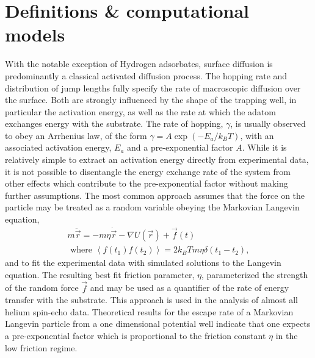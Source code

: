 \documentclass[7pt]{article}
\begin{document}
\section*{Definitions \& computational models}

With the notable exception of Hydrogen adsorbates\cite{McIntosh2013}, surface diffusion is predominantly a classical activated diffusion process. The hopping rate and distribution of jump lengths fully specify the rate of macroscopic diffusion over the surface. Both are strongly influenced by the shape of the trapping well, in particular the activation energy, as well as the rate at which the adatom exchanges energy with the substrate. The rate of hopping, $\gamma$, is usually observed to obey an Arrhenius law, of the form $\gamma = A\exp\left(-E_a/k_BT\right)$, with an associated activation energy, $E_a$ and a pre-exponential factor $A$. While it is relatively simple to extract an activation energy directly from experimental data\cite{Diamant,Alexandrowicz2006}, it is not possible to disentangle the energy exchange rate of the system from other effects which contribute to the pre-exponential factor without making further assumptions. The most common approach assumes that the force on the particle may be treated as a random variable obeying the Markovian Langevin equation,
\begin{equation}
\begin{gathered}
	m\ddot{\vec{r}}=-m\eta\dot{\vec{r}}-\nabla U(\vec{r})+\vec{f}(t) \\ 
	\text{ where } \left<f(t_1)f(t_2)\right>=2k_BTm\eta\delta(t_1-t_2),
\end{gathered}
	\label{eq:langevin}
\end{equation}
and to fit the experimental data with simulated solutions to the Langevin equation. The resulting best fit friction parameter, $\eta$, parameterized the strength of the random force $\vec{f}$ and may be used as a quantifier of the rate of energy transfer with the substrate. This approach is used in the analysis of almost all helium spin-echo data. Theoretical results for the escape rate of a Markovian Langevin particle from a one dimensional potential well indicate that one expects a pre-exponential factor which is proportional to the friction constant $\eta$ in the low friction regime\cite{Kramers, Zwanzig}. 
\end{document}
